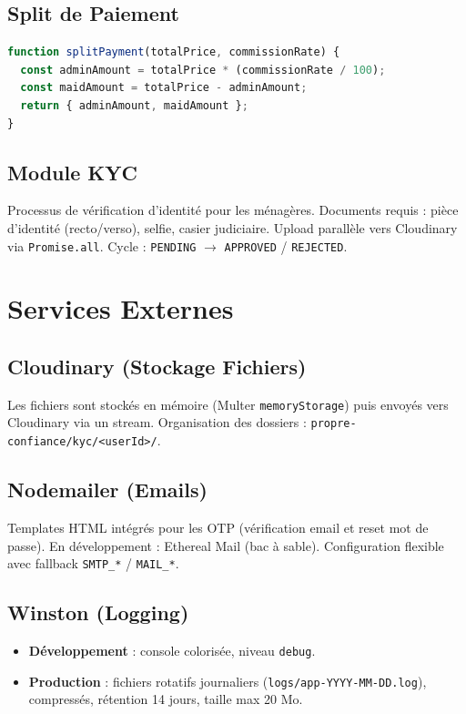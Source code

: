\documentclass[12pt,a4paper]{report}
\begin{document}
\section{Split de Paiement}
\begin{lstlisting}[language=TypeScript]
function splitPayment(totalPrice, commissionRate) {
  const adminAmount = totalPrice * (commissionRate / 100);
  const maidAmount = totalPrice - adminAmount;
  return { adminAmount, maidAmount };
}
\end{lstlisting}

\section{Module KYC}
Processus de vérification d'identité pour les ménagères. Documents requis : pièce d'identité (recto/verso), selfie, casier judiciaire. Upload parallèle vers Cloudinary via \texttt{Promise.all}. Cycle : \texttt{PENDING} $\to$ \texttt{APPROVED} / \texttt{REJECTED}.

\chapter{Services Externes}

\section{Cloudinary (Stockage Fichiers)}
Les fichiers sont stockés en mémoire (Multer \texttt{memoryStorage}) puis envoyés vers Cloudinary via un stream. Organisation des dossiers : \texttt{propre-confiance/kyc/<userId>/}.

\section{Nodemailer (Emails)}
Templates HTML intégrés pour les OTP (vérification email et reset mot de passe). En développement : Ethereal Mail (bac à sable). Configuration flexible avec fallback \texttt{SMTP\_*} / \texttt{MAIL\_*}.

\section{Winston (Logging)}
\begin{itemize}[nosep]
  \item \textbf{Développement} : console colorisée, niveau \texttt{debug}.
  \item \textbf{Production} : fichiers rotatifs journaliers (\texttt{logs/app-YYYY-MM-DD.log}), compressés, rétention 14 jours, taille max 20 Mo.
\end{itemize}
\end{document}
